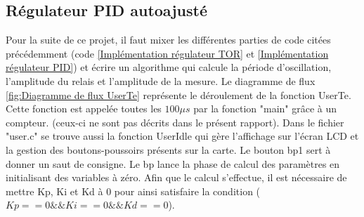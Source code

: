 \subsection{Régulateur PID autoajusté}
Pour la suite de ce projet, il faut mixer les différentes parties de code citées précédemment (code \ref{Implémentation régulateur TOR} et \ref{Implémentation régulateur PID}) et écrire un algorithme qui calcule la période d'oscillation, l'amplitude du relais et l'amplitude de la mesure. Le diagramme de flux \ref{fig:Diagramme de flux UserTe} représente le déroulement de la fonction UserTe. Cette fonction est appelée toutes les $100\mu s$ par la fonction "main" grâce à un compteur. (ceux-ci ne sont pas décrits dans le présent rapport). Dans le fichier "user.c" se trouve aussi la fonction UserIdle qui gère l'affichage sur l'écran LCD et la gestion des boutons-poussoirs présents sur la carte. Le bouton bp1 sert à donner un saut de consigne. Le bp lance la phase de calcul des paramètres en initialisant des variables à zéro. Afin que le calcul s'effectue, il est nécessaire de mettre Kp, Ki et Kd à 0 pour ainsi satisfaire la condition ($Kp==0 \&\& Ki==0 \&\& Kd==0$).

